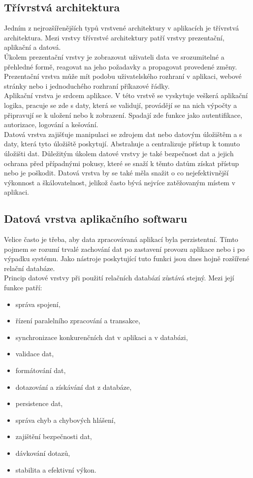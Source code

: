 \documentclass[ing,male,java,dept456]{diploma}						%
\begin{document}
\subsection{Třívrstvá architektura}

Jedním z nejrozšířenějších typů vrstvené architektury v aplikacích je třívrstvá architektura. Mezi vrstvy třívrstvé architektury patří vrstvy prezentační, aplikační a datová. \\
Úkolem prezentační vrstvy je zobrazovat uživateli data ve srozumitelné a přehledné formě, reagovat na jeho požadavky a propagovat provedené změny. Prezentační vrstva může mít podobu uživatelského rozhraní v aplikaci, webové stránky nebo i jednoduchého rozhraní příkazové řádky. \\
Aplikační vrstva je srdcem aplikace. V této vrstvě se vyskytuje veškerá aplikační logika, pracuje se zde s daty, která se validují, provádějí se na nich výpočty a připravují se k uložení nebo k zobrazení. Spadají zde funkce jako autentifikace, autorizace, logování a kešování. \\
Datová vrstva zajišťuje manipulaci se zdrojem dat nebo datovým úložištěm a s daty, která tyto úložiště poskytují. Abstrahuje a centralizuje přístup k tomuto úložišti dat. Důležitým úkolem datové vrstvy je také bezpečnost dat a jejich ochrana před případnými pokusy, které se snaží k těmto datům získat přístup nebo je poškodit. Datová vrstva by se také měla snažit o co nejefektivnější výkonnost a škálovatelnost, jelikož často bývá nejvíce zatěžovaným místem v aplikaci. \\

\subsection{Datová vrstva aplikačního softwaru}
\label{subsec:Data-layer}
Velice často je třeba, aby data zpracovávaná aplikací byla perzistentní. Tímto pojmem se rozumí trvalé zachování dat po zastavení provozu aplikace nebo i po výpadku systému. Jako nástroje poskytující tuto funkci jsou dnes hojně rozšířené relační databáze. \\
Princip datové vrstvy při použití relačních databází zůstává stejný. Mezi její funkce patří:
\begin{itemize}
\item správa spojení,
\item řízení paralelního zpracování a transakce,
\item synchronizace konkurenčních dat v aplikaci a v databázi,
\item validace dat,
\item formátování dat,
\item dotazování a získávání dat z databáze,
\item persistence dat,
\item správa chyb a chybových hlášení,
\item zajištění bezpečnosti dat,
\item dávkování dotazů,
\item stabilita a efektivní výkon.
\end{itemize}
\end{document}
